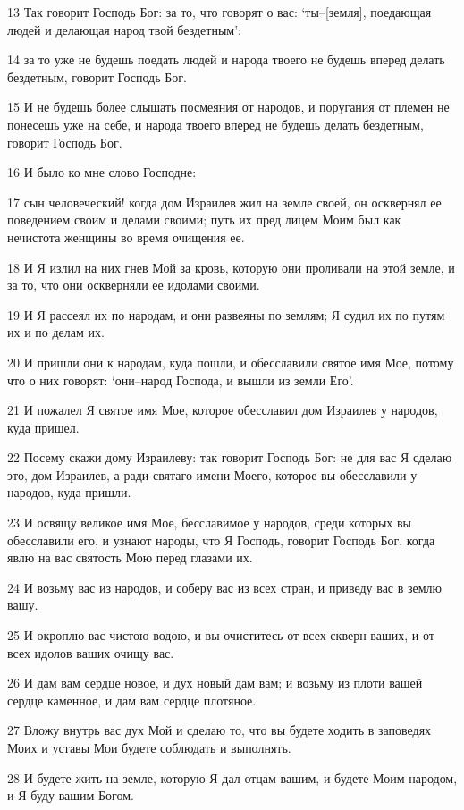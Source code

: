 \par 13 Так говорит Господь Бог: за то, что говорят о вас: `ты--[земля], поедающая людей и делающая народ твой бездетным':
\par 14 за то уже не будешь поедать людей и народа твоего не будешь вперед делать бездетным, говорит Господь Бог.
\par 15 И не будешь более слышать посмеяния от народов, и поругания от племен не понесешь уже на себе, и народа твоего вперед не будешь делать бездетным, говорит Господь Бог.
\par 16 И было ко мне слово Господне:
\par 17 сын человеческий! когда дом Израилев жил на земле своей, он осквернял ее поведением своим и делами своими; путь их пред лицем Моим был как нечистота женщины во время очищения ее.
\par 18 И Я излил на них гнев Мой за кровь, которую они проливали на этой земле, и за то, что они оскверняли ее идолами своими.
\par 19 И Я рассеял их по народам, и они развеяны по землям; Я судил их по путям их и по делам их.
\par 20 И пришли они к народам, куда пошли, и обесславили святое имя Мое, потому что о них говорят: `они--народ Господа, и вышли из земли Его'.
\par 21 И пожалел Я святое имя Мое, которое обесславил дом Израилев у народов, куда пришел.
\par 22 Посему скажи дому Израилеву: так говорит Господь Бог: не для вас Я сделаю это, дом Израилев, а ради святаго имени Моего, которое вы обесславили у народов, куда пришли.
\par 23 И освящу великое имя Мое, бесславимое у народов, среди которых вы обесславили его, и узнают народы, что Я Господь, говорит Господь Бог, когда явлю на вас святость Мою перед глазами их.
\par 24 И возьму вас из народов, и соберу вас из всех стран, и приведу вас в землю вашу.
\par 25 И окроплю вас чистою водою, и вы очиститесь от всех скверн ваших, и от всех идолов ваших очищу вас.
\par 26 И дам вам сердце новое, и дух новый дам вам; и возьму из плоти вашей сердце каменное, и дам вам сердце плотяное.
\par 27 Вложу внутрь вас дух Мой и сделаю то, что вы будете ходить в заповедях Моих и уставы Мои будете соблюдать и выполнять.
\par 28 И будете жить на земле, которую Я дал отцам вашим, и будете Моим народом, и Я буду вашим Богом.
